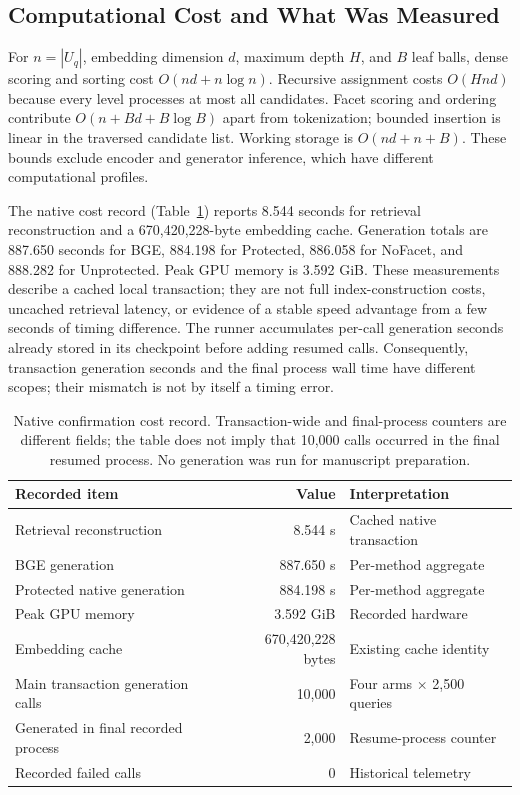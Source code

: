 \documentclass[11pt,a4paper]{article}
\begin{document}
\subsection{Computational Cost and What Was Measured}
For $n=|U_q|$, embedding dimension $d$, maximum depth $H$, and $B$ leaf
balls, dense scoring and sorting cost $O(nd+n\log n)$. Recursive assignment
costs $O(Hnd)$ because every level processes at most all candidates.
Facet scoring and ordering contribute $O(n+Bd+B\log B)$ apart from
tokenization; bounded insertion is linear in the traversed candidate list.
Working storage is $O(nd+n+B)$. These bounds exclude encoder and generator
inference, which have different computational profiles.

The native cost record (Table~\ref{tab:cost}) reports 8.544 seconds for retrieval
reconstruction and a 670,420,228-byte embedding cache. Generation totals are
887.650 seconds for BGE, 884.198 for Protected, 886.058 for NoFacet, and
888.282 for Unprotected. Peak GPU memory is 3.592 GiB. These measurements
describe a cached local transaction; they are not full index-construction
costs, uncached retrieval latency, or evidence of a stable speed advantage
from a few seconds of timing difference.
The runner accumulates per-call generation seconds already stored in its
checkpoint before adding resumed calls. Consequently, transaction generation
seconds and the final process wall time have different scopes; their mismatch
is not by itself a timing error.

\begin{table}[t]
\centering\small
\begin{tabular}{@{}p{}rp{}@{}}
\toprule
Recorded item & Value & Interpretation\\
\midrule
Retrieval reconstruction & 8.544 s & Cached native transaction\\
BGE generation & 887.650 s & Per-method aggregate\\
Protected native generation & 884.198 s & Per-method aggregate\\
Peak GPU memory & 3.592 GiB & Recorded hardware\\
Embedding cache & 670,420,228 bytes & Existing cache identity\\
Main transaction generation calls & 10,000 & Four arms $\times$ 2,500 queries\\
Generated in final recorded process & 2,000 & Resume-process counter\\
Recorded failed calls & 0 & Historical telemetry\\
\bottomrule
\end{tabular}
\caption{Native confirmation cost record. Transaction-wide and final-process
counters are different fields; the table does not imply that 10,000 calls
occurred in the final resumed process. No generation was run for manuscript
preparation.}
\label{tab:cost}
\end{table}
\end{document}
